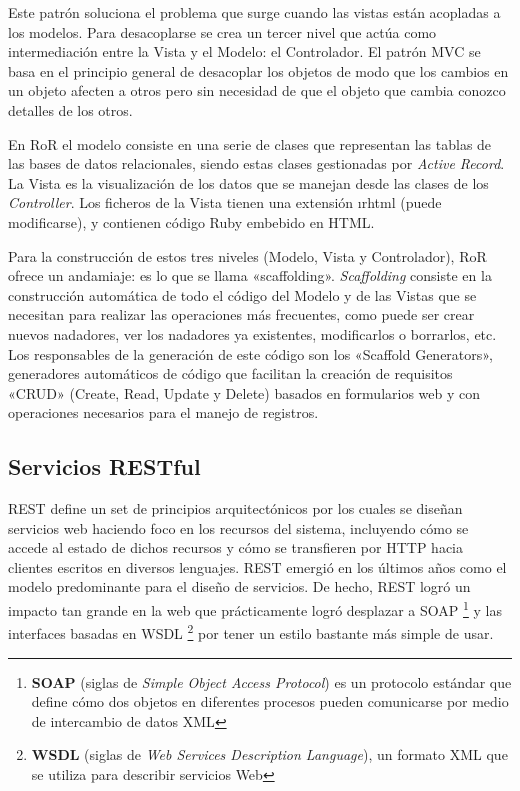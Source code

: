     Este patrón soluciona el problema que surge cuando las vistas están acopladas a los modelos. Para desacoplarse se crea un tercer nivel que actúa como intermediación entre la Vista y el Modelo: el Controlador. El patrón MVC se basa en el principio general de desacoplar los objetos de modo que los cambios en un objeto afecten a otros pero sin necesidad de que el objeto que cambia conozco detalles de los otros.
    
    En RoR el modelo consiste en una serie de clases que representan las tablas de las bases de datos relacionales, siendo estas clases gestionadas por {\it Active Record}. La Vista es la visualización de los datos que se manejan desde las clases de los {\it Controller}. Los ficheros de la Vista tienen una extensión {\i rhtml} (puede modificarse), y contienen código Ruby embebido en HTML.
    
    Para la construcción de estos tres niveles (Modelo, Vista y Controlador), RoR ofrece un andamiaje: es lo que se llama «scaffolding». {\it Scaffolding} consiste en la construcción automática de todo el código del Modelo y de las Vistas que se necesitan para realizar las operaciones más frecuentes, como puede ser crear nuevos nadadores, ver los nadadores ya existentes, modificarlos o borrarlos, etc. Los responsables de la generación de este código son los «Scaffold Generators», generadores automáticos de código que facilitan la creación de requisitos «CRUD» (Create, Read, Update y Delete) basados en formularios web y con operaciones necesarios para el manejo de registros.
    
  
  \subsection{Servicios RESTful} %
    \label{sub:servicios_restful}
    
    REST define un set de principios arquitectónicos por los cuales se diseñan servicios web haciendo foco en los recursos del sistema, incluyendo cómo se accede al estado de dichos recursos y cómo se transfieren por HTTP hacia clientes escritos en diversos lenguajes. REST emergió en los últimos años como el modelo predominante para el diseño de servicios. De hecho, REST logró un impacto tan grande en la web que prácticamente logró desplazar a SOAP \footnote{{\bf SOAP} (siglas de {\it Simple Object Access Protocol}) es un protocolo estándar que define cómo dos objetos en diferentes procesos pueden comunicarse por medio de intercambio de datos XML} y las interfaces basadas en WSDL \footnote {{\bf WSDL} (siglas de {\it Web Services Description Language}), un formato XML que se utiliza para describir servicios Web } por tener un estilo bastante más simple de usar.

